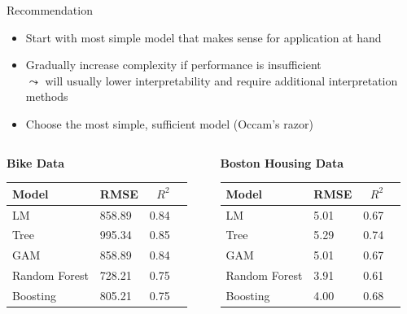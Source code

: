 \documentclass[11pt,compress,t,notes=noshow, aspectratio=169, xcolor=table]{beamer}
\begin{document}
\begin{frame}{Recommendation}
    \begin{itemize}
        \item Start with most simple model that makes sense for application at hand
        \item Gradually increase complexity if performance is insufficient\\
        $\leadsto$ will usually lower interpretability and require additional interpretation methods
        \item Choose the most simple, sufficient model (Occam's razor)
    \end{itemize} 

    \bigskip

\begin{columns}[T, totalwidth=\textwidth]
\begin{column}{0.5\textwidth}
\centering \textbf{Bike Data}
    \begin{table}[ht]
        \centering
        \begin{tabular}{llrr}
            \hline
            Model & RMSE & $R^2$ \\ 
            \hline
            LM & 858.89 & 0.84 \\ 
            Tree & 995.34 & 0.85 \\ 
            GAM & 858.89 & 0.84 \\ 
            Random Forest & 728.21 & 0.75 \\ 
            Boosting & 805.21 & 0.75 \\ 
            \hline
        \end{tabular}
    \end{table}
\end{column}
\begin{column}{0.5\textwidth}
\centering \textbf{Boston Housing Data}
    \begin{table}[ht]
        \centering
        \begin{tabular}{llrr}
            \hline
            Model & RMSE & $R^2$ \\ 
            \hline
            LM & 5.01 & 0.67 \\ 
            Tree & 5.29 & 0.74 \\ 
            GAM & 5.01 & 0.67 \\ 
            Random Forest & 3.91 & 0.61 \\ 
            Boosting & 4.00 & 0.68 \\ 
            \hline
        \end{tabular}
    \end{table}
\end{column}
\end{columns}
\end{frame}


\endlecture
\end{document}
